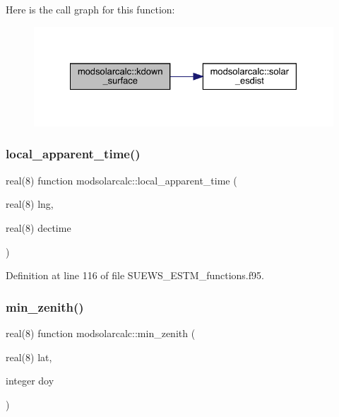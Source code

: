 Here is the call graph for this function\+:\nopagebreak
\begin{figure}[H]
\begin{center}
\leavevmode
\includegraphics[width=328pt]{namespacemodsolarcalc_af8c3c752c506d880efae84070a189a71_cgraph}
\end{center}
\end{figure}
\mbox{\label{namespacemodsolarcalc_a9ea53ee8fa5b7be8f0e7d919cc846182}} 
\subsubsection{\texorpdfstring{local\+\_\+apparent\+\_\+time()}{local\_apparent\_time()}}
{\footnotesize\ttfamily real(8) function modsolarcalc\+::local\+\_\+apparent\+\_\+time (\begin{DoxyParamCaption}\item[{real(8)}]{lng,  }\item[{real(8)}]{dectime }\end{DoxyParamCaption})}



Definition at line 116 of file S\+U\+E\+W\+S\+\_\+\+E\+S\+T\+M\+\_\+functions.\+f95.

\mbox{\label{namespacemodsolarcalc_adfed66792e245bded2293250a0436520}} 
\subsubsection{\texorpdfstring{min\+\_\+zenith()}{min\_zenith()}}
{\footnotesize\ttfamily real(8) function modsolarcalc\+::min\+\_\+zenith (\begin{DoxyParamCaption}\item[{real(8)}]{lat,  }\item[{integer}]{doy }\end{DoxyParamCaption})}



